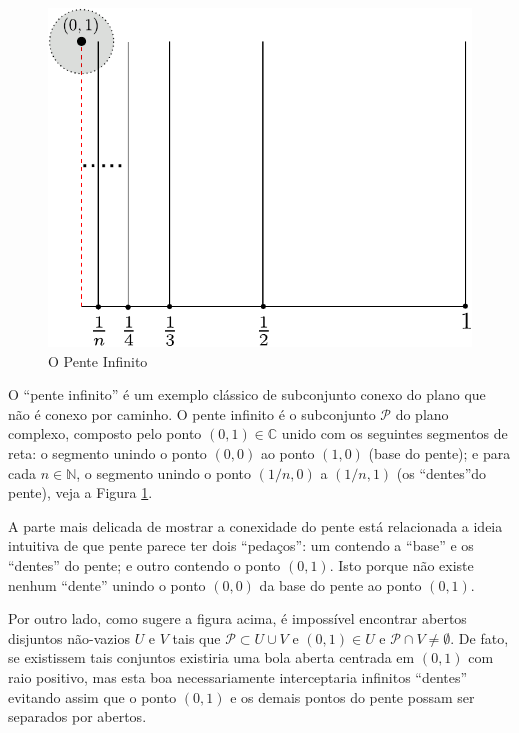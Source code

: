 \begin{figure}[H]
\centering
\includegraphics[scale=0.55]{Figuras/fig-pente}
\caption{O Pente Infinito}
\label{fig-pente}
\end{figure}

O ``pente infinito'' é um exemplo 
clássico de subconjunto conexo do plano que não é conexo por caminho.
O pente infinito é o subconjunto $\mathscr{P}$ do plano complexo, composto pelo ponto $(0,1)\in\mathbb{C}$
unido com os seguintes segmentos de reta: o segmento unindo o ponto $(0,0)$ ao ponto $(1,0)$ (base do pente);
e para cada $n\in\mathbb{N}$, o segmento unindo o ponto $(1/n,0)$ a $(1/n,1)$ (os ``dentes''do pente), 
veja a Figura \ref{fig-pente}.



A parte mais delicada de mostrar a conexidade do pente está relacionada 
a ideia intuitiva de que pente parece ter dois ``pedaços'': um contendo a ``base'' e os 
``dentes'' do pente; e outro contendo o ponto $(0,1)$. Isto porque não existe nenhum ``dente''
unindo o ponto $(0,0)$ da base do pente ao ponto $(0,1)$. 

Por outro lado, como sugere a figura acima, é impossível encontrar abertos disjuntos não-vazios
$U$ e $V$ tais que $\mathscr{P}\subset U\cup V$ e $(0,1)\in U$ e 
$\mathscr{P}\cap V\neq \emptyset$.
De fato, se existissem tais conjuntos existiria uma bola aberta centrada em $(0,1)$ 
com raio positivo, mas esta boa necessariamente interceptaria infinitos ``dentes'' 
evitando assim que o ponto $(0,1)$ e os demais pontos do pente possam ser separados
por abertos.

